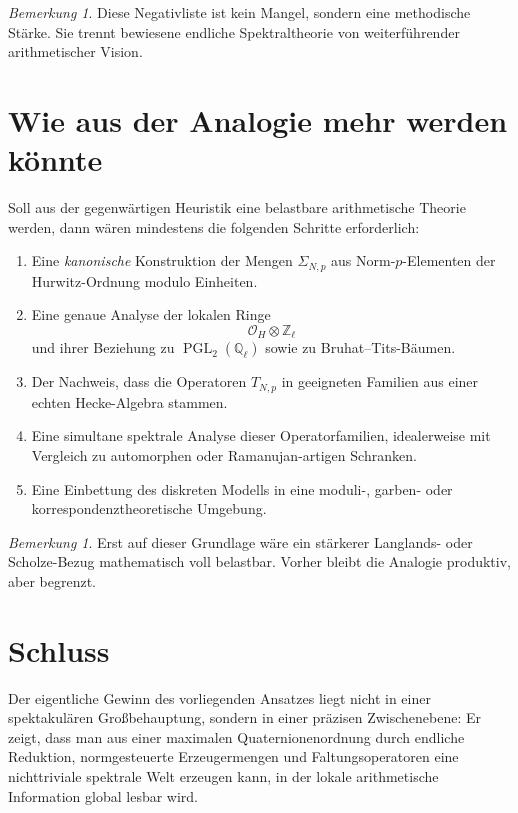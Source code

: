 \documentclass[12pt,a4paper]{article}
\newcommand{\PGL}{\operatorname{PGL}}
\theoremstyle{plain}
\theoremstyle{definition}
\theoremstyle{remark}
\newtheorem{bemerkung}[satz]{Bemerkung}
\newcommand{\Q}{\mathbb{Q}}
\newcommand{\Z}{\mathbb{Z}}
\newcommand{\OH}{\mathcal{O}_H}
\begin{document}
	\begin{bemerkung}
		Diese Negativliste ist kein Mangel,
		sondern eine methodische Stärke.
		Sie trennt bewiesene endliche Spektraltheorie
		von weiterführender arithmetischer Vision.
	\end{bemerkung}
	
	\section{Wie aus der Analogie mehr werden könnte}
	
	Soll aus der gegenwärtigen Heuristik eine belastbare arithmetische Theorie werden,
	dann wären mindestens die folgenden Schritte erforderlich:
	
	\begin{enumerate}[label=\arabic*.]
		\item Eine \emph{kanonische} Konstruktion der Mengen \(\Sigma_{N,p}\)
		aus Norm-\(p\)-Elementen der Hurwitz-Ordnung modulo Einheiten.
		\item Eine genaue Analyse der lokalen Ringe
		\[
		\OH\otimes \Z_\ell
		\]
		und ihrer Beziehung zu \(\PGL_2(\Q_\ell)\) sowie zu Bruhat--Tits-Bäumen.
		\item Der Nachweis, dass die Operatoren \(T_{N,p}\) in geeigneten Familien
		aus einer echten Hecke-Algebra stammen.
		\item Eine simultane spektrale Analyse dieser Operatorfamilien,
		idealerweise mit Vergleich zu automorphen oder Ramanujan-artigen Schranken.
		\item Eine Einbettung des diskreten Modells in eine moduli-,
		garben- oder korrespondenztheoretische Umgebung.
	\end{enumerate}
	
	\begin{bemerkung}
		Erst auf dieser Grundlage wäre ein stärkerer Langlands- oder Scholze-Bezug
		mathematisch voll belastbar.
		Vorher bleibt die Analogie produktiv, aber begrenzt.
	\end{bemerkung}
	
	\section{Schluss}
	
	Der eigentliche Gewinn des vorliegenden Ansatzes liegt nicht in einer
	spektakulären Großbehauptung,
	sondern in einer präzisen Zwischenebene:
	Er zeigt, dass man aus einer maximalen Quaternionenordnung
	durch endliche Reduktion, normgesteuerte Erzeugermengen und Faltungsoperatoren
	eine nichttriviale spektrale Welt erzeugen kann,
	in der lokale arithmetische Information global lesbar wird.
	
\end{document}
